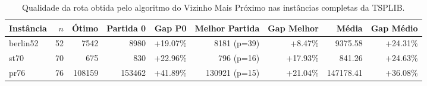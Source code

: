 \begin{table}[htbp]
\centering
\small
\caption{Qualidade da rota obtida pelo algoritmo do Vizinho Mais Próximo nas instâncias completas da TSPLIB.}
\label{tab:qualidade_nn_completas}
\begin{tabular}{lrrrrrrrr}
\toprule
Instância & $n$ & Ótimo & Partida 0 & Gap P0 & Melhor Partida & Gap Melhor & Média & Gap Médio \\
\midrule
berlin52 & 52 & 7542 & 8980 & +19.07\% & 8181 (p=39) & +8.47\% & 9375.58 & +24.31\% \\
st70 & 70 & 675 & 830 & +22.96\% & 796 (p=16) & +17.93\% & 841.26 & +24.63\% \\
pr76 & 76 & 108159 & 153462 & +41.89\% & 130921 (p=15) & +21.04\% & 147178.41 & +36.08\% \\
\bottomrule
\end{tabular}
\end{table}
